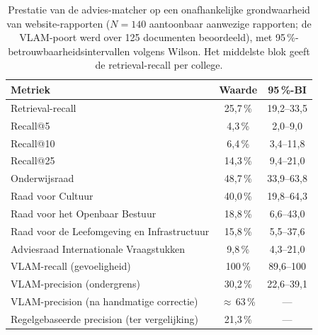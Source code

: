 \begin{table}[htbp]
\centering
\caption{Prestatie van de advies-matcher op een onafhankelijke grondwaarheid van
website-rapporten ($N = 140$ aantoonbaar aanwezige rapporten; de VLAM-poort werd over
125 documenten beoordeeld), met 95\,\%-betrouwbaarheidsintervallen volgens Wilson. Het
middelste blok geeft de retrieval-recall per college.}
\label{tab:dv1-advies-eval}
\footnotesize
\begin{tabular}{@{}lcc@{}}
\toprule
Metriek & Waarde & 95\,\%-BI \\
\midrule
Retrieval-recall & 25,7\,\% & 19,2--33,5 \\
Recall@5         & 4,3\,\%  & 2,0--9,0 \\
Recall@10        & 6,4\,\%  & 3,4--11,8 \\
Recall@25        & 14,3\,\% & 9,4--21,0 \\
\midrule
Onderwijsraad                                & 48,7\,\% & 33,9--63,8 \\
Raad voor Cultuur                            & 40,0\,\% & 19,8--64,3 \\
Raad voor het Openbaar Bestuur               & 18,8\,\% & 6,6--43,0 \\
Raad voor de Leefomgeving en Infrastructuur  & 15,8\,\% & 5,5--37,6 \\
Adviesraad Internationale Vraagstukken       & 9,8\,\%  & 4,3--21,0 \\
\midrule
VLAM-recall (gevoeligheid)                   & 100\,\%      & 89,6--100 \\
VLAM-precision (ondergrens)                  & 30,2\,\%     & 22,6--39,1 \\
VLAM-precision (na handmatige correctie)     & $\approx$\,63\,\% & --- \\
Regelgebaseerde precision (ter vergelijking) & 21,3\,\%     & --- \\
\bottomrule
\end{tabular}
\end{table}
